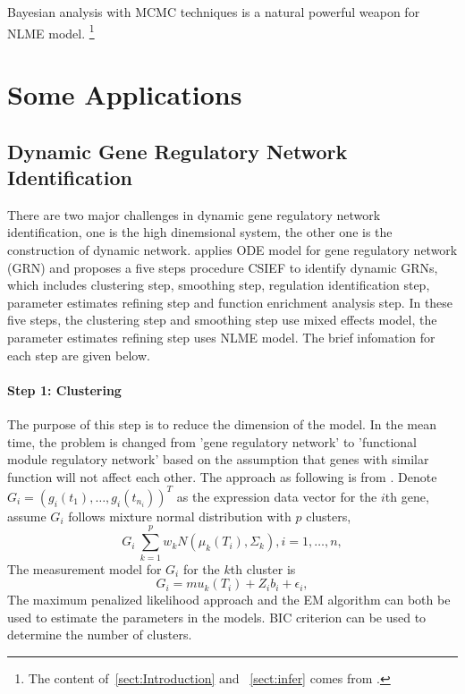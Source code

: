 \documentclass[12pt]{extarticle}
\begin{document}
Bayesian analysis with MCMC techniques is a natural powerful weapon for NLME model. \footnote{The content of~\ref{sect:Introduction} and ~\ref{sect:infer} comes from \cite{Davidian03}.}

\section{Some Applications}
\label{sect:application}

\subsection{Dynamic Gene Regulatory Network Identification}
\label{sect:network}
There are two major challenges in dynamic gene regulatory network identification, one is the high dinemsional system, the other one is the construction of dynamic network. \cite{Lu11}  applies ODE model for gene regulatory network (GRN) and proposes a five steps procedure CSIEF to identify dynamic GRNs, which includes clustering step, smoothing step, regulation identification step, parameter estimates refining step and function enrichment analysis step.
In these five steps, the clustering step and smoothing step use mixed effects model, the parameter estimates refining step uses NLME model. The brief infomation for each step are given below.

\paragraph{Step 1: Clustering}
The purpose of this step is to reduce the dimension of the model. In the mean time, the problem is changed from 'gene regulatory network' to 'functional module regulatory network' based on the assumption that genes with similar function will not affect each other.
The approach as following is from  \cite{Ma08}.
Denote $G_i={(g_{i}(t_{1}),\ldots,g_{i}(t_{n_i}))}^T$ as the expression data vector for the $i$th gene, assume $G_i$ follows mixture normal distribution with $p$ clusters,
\begin{equation}
G_{i}~\sum_{k=1}^{p}w_{k}N(\mu_{k}(T_{i}),\Sigma_{k}), i=1,\ldots,n,
\end{equation}
The measurement model for $G_i$ for the $k$th cluster is
\begin{equation}
G_i=mu_{k}(T_{i})+Z_{i}b_{i}+\epsilon_{i},
\end{equation}
The maximum penalized likelihood approach and the EM algorithm can both be used to estimate the parameters in the models. BIC criterion can be used to determine the number of clusters.
\end{document}
